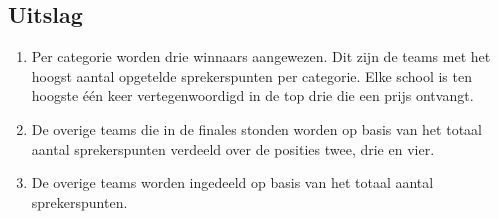 \subsection{Uitslag}

\begin{enumerate}
\item Per categorie worden drie winnaars aangewezen. Dit zijn de teams met het hoogst aantal opgetelde sprekerspunten per categorie. Elke school is ten hoogste één keer vertegenwoordigd in de top drie die een prijs ontvangt. 
\item De overige teams die in de finales stonden worden op basis van het totaal aantal sprekerspunten verdeeld over de posities twee, drie en vier.
\item De overige teams worden ingedeeld op basis van het totaal aantal sprekerspunten.
\end{enumerate}
